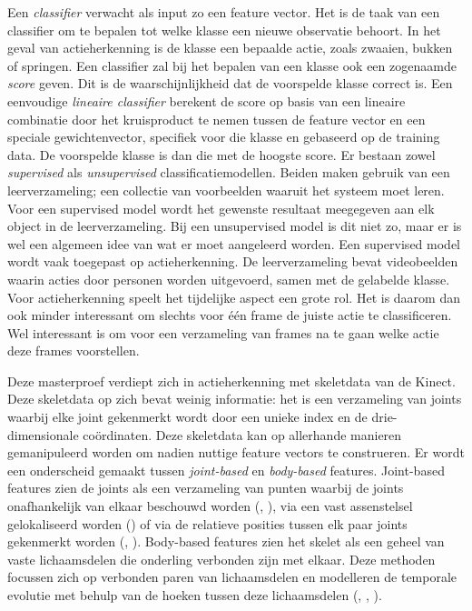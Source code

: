 Een \textit{classifier} verwacht als input zo een feature vector. Het is de taak van een classifier om te bepalen tot welke klasse een nieuwe observatie behoort. In het geval van actieherkenning is de klasse een bepaalde actie, zoals zwaaien, bukken of springen. Een classifier zal bij het bepalen van een klasse ook een zogenaamde \textit{score} geven. Dit is de waarschijnlijkheid dat de voorspelde klasse correct is. Een eenvoudige \textit{lineaire classifier} berekent de score op basis van een lineaire combinatie door het kruisproduct te nemen tussen de feature vector en een speciale gewichtenvector, specifiek voor die klasse en gebaseerd op de training data. De voorspelde klasse is dan die met de hoogste score. Er bestaan zowel \textit{supervised} als \textit{unsupervised} classificatiemodellen. Beiden maken gebruik van een leerverzameling; een collectie van voorbeelden waaruit het systeem moet leren. Voor een supervised model wordt het gewenste resultaat meegegeven aan elk object in de leerverzameling. Bij een unsupervised model is dit niet zo, maar er is wel een algemeen idee van wat er moet aangeleerd worden. Een supervised model wordt vaak toegepast op actieherkenning. De leerverzameling bevat videobeelden waarin acties door personen worden uitgevoerd, samen met de gelabelde klasse. Voor actieherkenning speelt het tijdelijke aspect een grote rol. Het is daarom dan ook minder interessant om slechts voor één frame de juiste actie te classificeren. Wel interessant is om voor een verzameling van frames na te gaan welke actie deze frames voorstellen. 

Deze masterproef verdiept zich in actieherkenning met skeletdata van de Kinect. Deze skeletdata op zich bevat weinig informatie: het is een verzameling van joints waarbij elke joint gekenmerkt wordt door een unieke index en de drie-dimensionale coördinaten. Deze skeletdata kan op allerhande manieren gemanipuleerd worden om nadien nuttige feature vectors te construeren. Er wordt een onderscheid gemaakt tussen \textit{joint-based} en \textit{body-based} features. Joint-based features zien de joints als een verzameling van punten waarbij de joints onafhankelijk van elkaar beschouwd worden (\cite{Hussein2011}, \cite{Lv2006}), via een vast assenstelsel gelokaliseerd worden (\cite{Xia2012}) of via de relatieve posities tussen elk paar joints gekenmerkt worden (\cite{Wang2012b}, \cite{Yang2012}). Body-based features zien het skelet als een geheel van vaste lichaamsdelen die onderling verbonden zijn met elkaar. Deze methoden focussen zich op verbonden paren van lichaamsdelen en modelleren de temporale evolutie met behulp van de hoeken tussen deze lichaamsdelen (\cite{Ofli2012}, \cite{Ohn-Bar2013}, \cite{Deboeverie2016}). 

